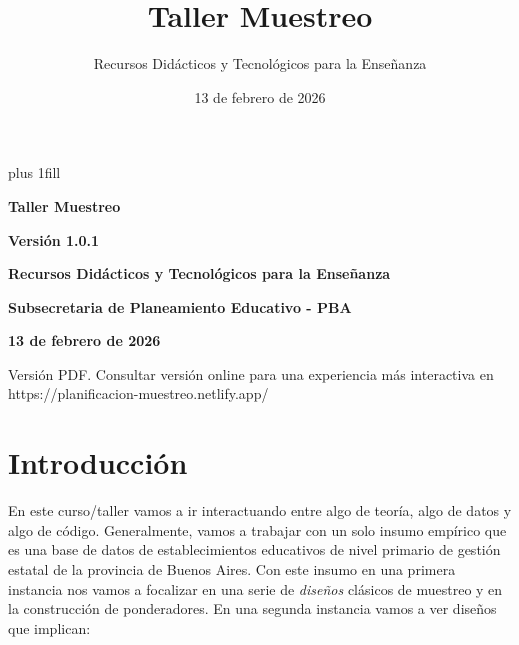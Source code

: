 \documentclass[
  spanish,
  a4paper,
]{scrreprt}
\title{Taller Muestreo}
\author{Recursos Didácticos y Tecnológicos para la Enseñanza}
\date{13 de febrero de 2026}
\renewcommand*\contentsname{Tabla de contenidos}
\newcommand\contentsname{Tabla de contenidos}
\renewcommand*\listfigurename{Listado de Figuras}
\newcommand\listfigurename{Listado de Figuras}
\renewcommand*\listtablename{Listado de Tablas}
\newcommand\listtablename{Listado de Tablas}
\begin{document}
\cleardoublepage
\thispagestyle{empty}
{\centering
\hbox{}\vskip 0cm plus 1fill
{\Huge\bfseries Taller Muestreo \par}
\vspace{3ex}
{\bfseries\large Versión 1.0.1 \par}
\vspace{12ex}
{\Large\bfseries Recursos Didácticos y Tecnológicos para la
Enseñanza \par}
\vspace{3ex}
%
%
{\bfseries\large  \par}
\vspace{12ex}
%
%
{\bfseries\large Subsecretaria de Planeamiento Educativo - PBA \par}
\vspace{12ex}
%
%
{\bfseries\large  \par}
\vspace{12ex}
%
%
{\bfseries\large  \par}
\vspace{12ex}
%
\vspace{12ex}
{\bfseries\large 13 de febrero de 2026 \par}
\vspace{12ex}
{\small Versión PDF. Consultar versión online para una experiencia más interactiva en https://planificacion-muestreo.netlify.app/ \par}
}

\let\mainmatterreal\mainmatter
\let\mainmatter\relax
\renewcommand*\contentsname{Tabla de contenidos}
\hypersetup{linkcolor=}
\setcounter{tocdepth}{2}
\renewcommand*\listfigurename{List of figures}
\renewcommand*\listtablename{List of tables}
\noindent 


\chapter{Introducción}\label{sec-introduccion}

En este curso/taller vamos a ir interactuando entre algo de teoría, algo
de datos y algo de código. Generalmente, vamos a trabajar con un solo
insumo empírico que es una base de datos de establecimientos educativos
de nivel primario de gestión estatal de la provincia de Buenos Aires.
Con este insumo en una primera instancia nos vamos a focalizar en una
serie de \emph{diseños} clásicos de muestreo y en la construcción de
ponderadores. En una segunda instancia vamos a ver diseños que implican:
\end{document}
